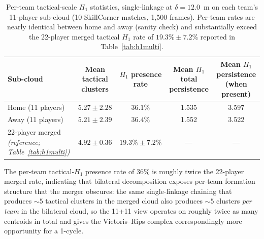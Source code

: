 \begin{table}[H]
  \centering
  \caption{Per-team tactical-scale \(H_1\) statistics, single-linkage at \(\delta=12.0\)~m on each team's 11-player sub-cloud (10 SkillCorner matches, 1{,}500 frames). Per-team rates are nearly identical between home and away (sanity check) and substantially exceed the 22-player merged tactical \(H_1\) rate of \(19.3\%\pm7.2\%\) reported in Table~\ref{tab:h1multi}.}
  \label{tab:bilateral_perteam}
  \begin{tabular}{@{}lcccc@{}}
      \toprule
      Sub-cloud & Mean tactical clusters & \(H_1\) presence rate & Mean \(H_1\) total persistence & Mean \(H_1\) persistence (when present) \\
      \midrule
      Home (11 players) & \(5.27\pm2.28\) & \(36.1\%\) & 1.535 & 3.597 \\
      Away (11 players) & \(5.21\pm2.39\) & \(36.4\%\) & 1.552 & 3.522 \\
      \midrule
      22-player merged \emph{(reference; Table~\ref{tab:h1multi})} & \(4.92\pm0.36\) & \(19.3\%\pm7.2\%\) & --- & --- \\
      \bottomrule
  \end{tabular}
\end{table}

The per-team tactical-\(H_1\) presence rate of \(36\%\) is roughly twice the 22-player merged rate, indicating that bilateral decomposition exposes per-team formation structure that the merger obscures: the same single-linkage chaining that produces \(\sim 5\) tactical clusters in the merged cloud also produces \(\sim 5\) clusters \emph{per team} in the bilateral cloud, so the 11+11 view operates on roughly twice as many centroids in total and gives the Vietoris--Rips complex correspondingly more opportunity for a 1-cycle.

